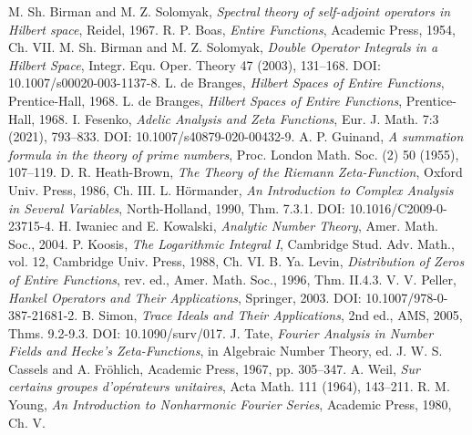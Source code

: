 \documentclass[12pt]{article}
\begin{document}
\begin{thebibliography}{16}
 M. Sh. Birman and M. Z. Solomyak, \emph{Spectral theory of self-adjoint operators in Hilbert space}, Reidel, 1967.
 R. P. Boas, \emph{Entire Functions}, Academic Press, 1954, Ch. VII.
 M. Sh. Birman and M. Z. Solomyak, \emph{Double Operator Integrals in a Hilbert Space}, Integr. Equ. Oper. Theory 47 (2003), 131–168. DOI: 10.1007/s00020-003-1137-8.
 L. de Branges, \emph{Hilbert Spaces of Entire Functions}, Prentice-Hall, 1968.
 L. de Branges, \emph{Hilbert Spaces of Entire Functions}, Prentice-Hall, 1968.
 I. Fesenko, \emph{Adelic Analysis and Zeta Functions}, Eur. J. Math. 7:3 (2021), 793–833. DOI: 10.1007/s40879-020-00432-9.
 A. P. Guinand, \emph{A summation formula in the theory of prime numbers}, Proc. London Math. Soc. (2) 50 (1955), 107–119.
 D. R. Heath-Brown, \emph{The Theory of the Riemann Zeta-Function}, Oxford Univ. Press, 1986, Ch. III.
 L. Hörmander, \emph{An Introduction to Complex Analysis in Several Variables}, North-Holland, 1990, Thm. 7.3.1. DOI: 10.1016/C2009-0-23715-4.
 H. Iwaniec and E. Kowalski, \emph{Analytic Number Theory}, Amer. Math. Soc., 2004.
 P. Koosis, \emph{The Logarithmic Integral I}, Cambridge Stud. Adv. Math., vol. 12, Cambridge Univ. Press, 1988, Ch. VI.
 B. Ya. Levin, \emph{Distribution of Zeros of Entire Functions}, rev. ed., Amer. Math. Soc., 1996, Thm. II.4.3.
 V. V. Peller, \emph{Hankel Operators and Their Applications}, Springer, 2003. DOI: 10.1007/978-0-387-21681-2.
 B. Simon, \emph{Trace Ideals and Their Applications}, 2nd ed., AMS, 2005, Thms. 9.2-9.3. DOI: 10.1090/surv/017.
 J. Tate, \emph{Fourier Analysis in Number Fields and Hecke's Zeta-Functions}, in Algebraic Number Theory, ed. J. W. S. Cassels and A. Fröhlich, Academic Press, 1967, pp. 305–347.
 A. Weil, \emph{Sur certains groupes d'opérateurs unitaires}, Acta Math. 111 (1964), 143–211.
 R. M. Young, \emph{An Introduction to Nonharmonic Fourier Series}, Academic Press, 1980, Ch. V.
\end{thebibliography}
\end{document}
